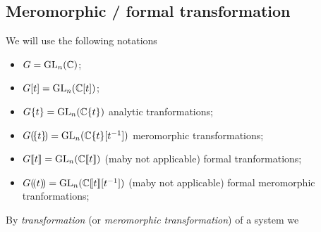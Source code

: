 \subsection{Meromorphic / formal transformation}
\begin{comment}\footnotesize
  see \cite{thboalch} \textbf{Rem 1.41 on p. 16}:
  \begin{rem}
    Note that in most of the recent references we have used, Stokes matrices
    are used to classify
    \begin{itemize}
      \item meromorphic connections within fixed \textbf{formal meromorphic
        classes, modulo meromorphic equivalence}.
    \end{itemize}
    Whereas here we classify
    \begin{itemize}
      \item meromorphic connections within fixed \textbf{formal analytic
        classes, modulo analytic equivalence},
    \end{itemize}
    as is done in the older literature.  The fact is that the sets equivalence
    classes are the same in both cases. It is important for us to work with
    analytic, rather than meromorphic gauge transformations, because then the
    $\C^\infty$ viewpoint in Chapter 3 is cleaner. This distinction relates to
    the difference between \textbf{‘regular singular’} connections and
    \textbf{‘logarithmic’} connections.
  \end{rem}
\end{comment}
\begin{notations}
  We will use the following notations
  \begin{itemize}
    \item $G=\operatorname{GL}_n(\mathbb{C})$;
    \item $G[t]=\operatorname{GL}_n(\mathbb{C}[t])$;
    \item $G\{t\}=\operatorname{GL}_n(\mathbb{C}\{t\})$ analytic tranformations;
    \item $G(\!\{t\}\!)=\operatorname{GL}_n(\mathbb{C}\{t\}[t^{-1}])$ meromorphic transformations;
    \item $G\llbracket t\rrbracket=\operatorname{GL}_n(\mathbb{C}\llbracket t\rrbracket)$
      (maby not applicable) formal tranformations;
    \item $G(\!(t)\!)=\operatorname{GL}_n(\mathbb{C}\llbracket t\rrbracket[t^{-1}])$
      (maby not applicable) formal meromorphic tranformations;
  \end{itemize}
\end{notations}
By \emph{transformation} (or \emph{meromorphic transformation}) of a system we
